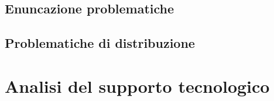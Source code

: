 \documentclass[a4paper]{article}
\begin{document}
\subsection{Enuncazione problematiche}

\subsection{Problematiche di distribuzione}


\section{Analisi del supporto tecnologico}

\appendix


\end{document}
